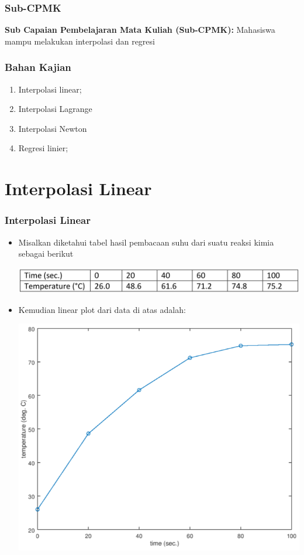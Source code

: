 \documentclass[pdflatex,compress]{beamer}
\begin{document}
\begin{frame}
	\frametitle{Sub-CPMK}
	\textbf{Sub Capaian Pembelajaran Mata Kuliah (Sub-CPMK):} Mahasiswa mampu melakukan interpolasi dan regresi
\end{frame}

\begin{frame}
	\frametitle{Bahan Kajian}
	\begin{enumerate}
		\item Interpolasi linear;
		\item Interpolasi Lagrange
		\item Interpolasi Newton
		\item Regresi linier;
	\end{enumerate}
\end{frame}

\section{Interpolasi Linear}

\begin{frame}
	\frametitle{Interpolasi Linear}
	\begin{itemize}
		\item Misalkan diketahui tabel hasil pembacaan suhu dari suatu reaksi kimia sebagai berikut
		\begin{center}
			\includegraphics[width=0.8\linewidth]{img/img01}
		\end{center}
		\item Kemudian linear plot dari data di atas adalah:
		\begin{center}
			\includegraphics[width=0.5\linewidth]{img/img02}
		\end{center}
	\end{itemize}
\end{frame}
\end{document}
